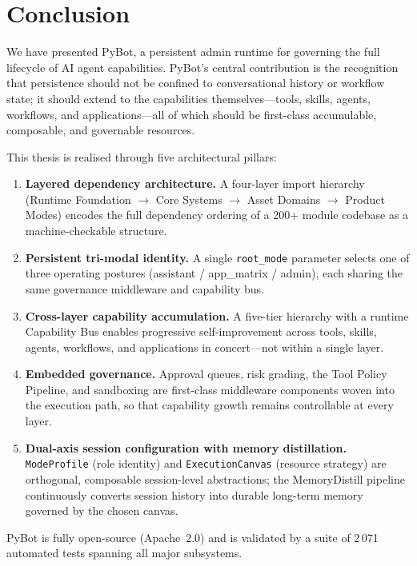 \documentclass[11pt,a4paper]{article}
\begin{document}
\section{Conclusion}
\label{sec:conclusion}

We have presented PyBot, a persistent admin runtime for governing the full lifecycle of AI agent capabilities.
PyBot's central contribution is the recognition that persistence should not be confined to conversational history or workflow state; it should extend to the capabilities themselves---tools, skills, agents, workflows, and applications---all of which should be first-class accumulable, composable, and governable resources.

This thesis is realised through five architectural pillars:

\begin{enumerate}
  \item \textbf{Layered dependency architecture.}
        A four-layer import hierarchy (Runtime Foundation $\to$ Core Systems $\to$ Asset Domains $\to$ Product Modes) encodes the full dependency ordering of a 200+ module codebase as a machine-checkable structure.
  \item \textbf{Persistent tri-modal identity.}
        A single \texttt{root\_mode} parameter selects one of three operating postures (assistant / app\_matrix / admin), each sharing the same governance middleware and capability bus.
  \item \textbf{Cross-layer capability accumulation.}
        A five-tier hierarchy with a runtime Capability Bus enables progressive self-improvement across tools, skills, agents, workflows, and applications in concert---not within a single layer.
  \item \textbf{Embedded governance.}
        Approval queues, risk grading, the Tool Policy Pipeline, and sandboxing are first-class middleware components woven into the execution path, so that capability growth remains controllable at every layer.
  \item \textbf{Dual-axis session configuration with memory distillation.}
        \texttt{ModeProfile} (role identity) and \texttt{ExecutionCanvas} (resource strategy) are orthogonal, composable session-level abstractions; the MemoryDistill pipeline continuously converts session history into durable long-term memory governed by the chosen canvas.
\end{enumerate}

PyBot is fully open-source (Apache~2.0) and is validated by a suite of 2\,071 automated tests spanning all major subsystems.
\end{document}

